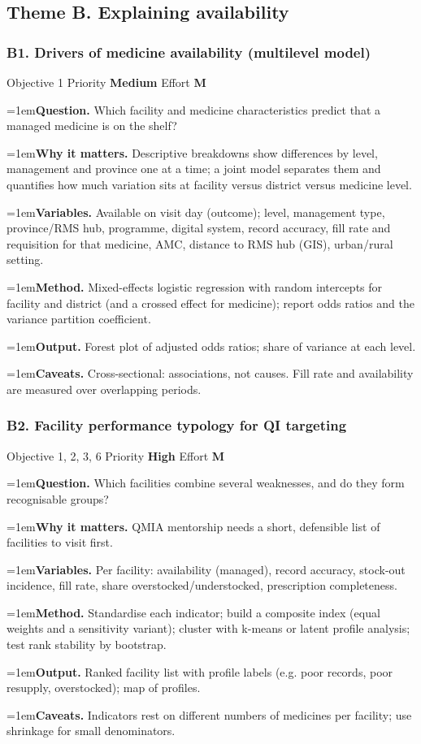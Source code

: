 \documentclass[10pt,a4paper]{article}
\newcommand{\field}[2]{\par\hangindent=1em\textbf{#1.} #2}
\begin{document}
\subsection{Theme B. Explaining availability}
\subsubsection*{B1. Drivers of medicine availability (multilevel model)}
{\footnotesize\color{gray} Objective 1 \textperiodcentered{} Priority \textbf{Medium} \textperiodcentered{} Effort \textbf{M}}
\field{Question}{Which facility and medicine characteristics predict that a managed medicine is on the shelf?}
\field{Why it matters}{Descriptive breakdowns show differences by level, management and province one at a time; a joint model separates them and quantifies how much variation sits at facility versus district versus medicine level.}
\field{Variables}{Available on visit day (outcome); level, management type, province/RMS hub, programme, digital system, record accuracy, fill rate and requisition for that medicine, AMC, distance to RMS hub (GIS), urban/rural setting.}
\field{Method}{Mixed-effects logistic regression with random intercepts for facility and district (and a crossed effect for medicine); report odds ratios and the variance partition coefficient.}
\field{Output}{Forest plot of adjusted odds ratios; share of variance at each level.}
\field{Caveats}{Cross-sectional: associations, not causes. Fill rate and availability are measured over overlapping periods.}
\subsubsection*{B2. Facility performance typology for QI targeting}
{\footnotesize\color{gray} Objective 1, 2, 3, 6 \textperiodcentered{} Priority \textbf{High} \textperiodcentered{} Effort \textbf{M}}
\field{Question}{Which facilities combine several weaknesses, and do they form recognisable groups?}
\field{Why it matters}{QMIA mentorship needs a short, defensible list of facilities to visit first.}
\field{Variables}{Per facility: availability (managed), record accuracy, stock-out incidence, fill rate, share overstocked/understocked, prescription completeness.}
\field{Method}{Standardise each indicator; build a composite index (equal weights and a sensitivity variant); cluster with k-means or latent profile analysis; test rank stability by bootstrap.}
\field{Output}{Ranked facility list with profile labels (e.g. poor records, poor resupply, overstocked); map of profiles.}
\field{Caveats}{Indicators rest on different numbers of medicines per facility; use shrinkage for small denominators.}
\end{document}
